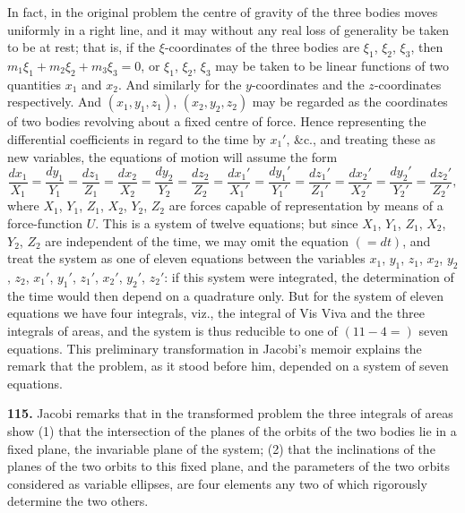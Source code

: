 \documentclass[11pt,a4paper]{book}
\begin{document}

In fact, in the original problem the centre of gravity of the three bodies moves uniformly in a right line, and it may without any real loss of generality be taken to be at rest; that is, if the $\xi$-coordinates of the three bodies are $\xi_1$, $\xi_2$, $\xi_3$, then $m_1\xi_1 + m_2\xi_2 + m_3\xi_3 = 0$, or $\xi_1$, $\xi_2$, $\xi_3$ may be taken to be linear functions of two quantities $x_1$ and $x_2$. And similarly for the $y$-coordinates and the $z$-coordinates respectively. And $(x_1, y_1, z_1)$, $(x_2, y_2, z_2)$ may be regarded as the coordinates of two bodies revolving about a fixed centre of force. Hence representing the differential coefficients in regard to the time by $x_1'$, \&c., and treating these as new variables, the equations of motion will assume the form
\[
\frac{dx_1}{X_1} = \frac{dy_1}{Y_1} = \frac{dz_1}{Z_1} = \frac{dx_2}{X_2} = \frac{dy_2}{Y_2} = \frac{dz_2}{Z_2} = \frac{dx_1'}{X_1'} = \frac{dy_1'}{Y_1'} = \frac{dz_1'}{Z_1'} = \frac{dx_2'}{X_2'} = \frac{dy_2'}{Y_2'} = \frac{dz_2'}{Z_2'},
\]
where $X_1$, $Y_1$, $Z_1$, $X_2$, $Y_2$, $Z_2$ are forces capable of representation by means of a force-function $U$. This is a system of twelve equations; but since $X_1$, $Y_1$, $Z_1$, $X_2$, $Y_2$, $Z_2$ are independent of the time, we may omit the equation $(=dt)$, and treat the system as one of eleven equations between the variables $x_1$, $y_1$, $z_1$, $x_2$, $y_2$, $z_2$, $x_1'$, $y_1'$, $z_1'$, $x_2'$, $y_2'$, $z_2'$: if this system were integrated, the determination of the time would then depend on a quadrature only. But for the system of eleven equations we have four integrals, viz., the integral of Vis Viva and the three integrals of areas, and the system is thus reducible to one of $(11 - 4 =)$ seven equations. This preliminary transformation in Jacobi's memoir explains the remark that the problem, as it stood before him, depended on a system of seven equations.

\textbf{115.} Jacobi remarks that in the transformed problem the three integrals of areas show (1) that the intersection of the planes of the orbits of the two bodies lie in a fixed plane, the invariable plane of the system; (2) that the inclinations of the planes of the two orbits to this fixed plane, and the parameters of the two orbits considered as variable ellipses, are four elements any two of which rigorously determine the two others.
\end{document}
